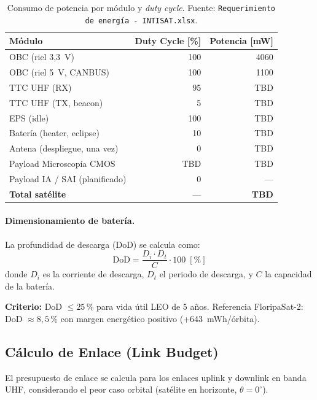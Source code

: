 \begin{table}[h]
\centering
\caption{Consumo de potencia por módulo y \textit{duty cycle}. Fuente: \texttt{Requerimiento de energía - INTISAT.xlsx}.}
\label{tab:power_consumption}
\begin{tabular}{lrr}
\toprule
\textbf{Módulo} & \textbf{Duty Cycle [\%]} & \textbf{Potencia [mW]} \\
\midrule
OBC (riel 3{,}3~V)                & 100 & 4060 \\
OBC (riel 5~V, CANBUS)            & 100 & 1100 \\
TTC UHF (RX)                      & 95  & TBD \\
TTC UHF (TX, beacon)              & 5   & TBD \\
EPS (idle)                        & 100 & TBD \\
Batería (heater, eclipse)         & 10  & TBD \\
Antena (despliegue, una vez)      & 0   & TBD \\
Payload Microscopía CMOS          & TBD & TBD \\
Payload IA / SAI (planificado)    & 0   & --- \\
\midrule
\textbf{Total satélite}           & --- & \textbf{TBD} \\
\bottomrule
\end{tabular}
\end{table}

\paragraph{Dimensionamiento de batería.}
La profundidad de descarga (DoD) se calcula como:
\begin{equation}
\mathrm{DoD} = \frac{D_i \cdot D_t}{C} \cdot 100\;[\%]
\label{eq:dod}
\end{equation}
donde $D_i$ es la corriente de descarga, $D_t$ el periodo de descarga, y $C$ la capacidad de la batería.

\textbf{Criterio:} DoD $\le 25$\,\% para vida útil LEO de 5 años. Referencia FloripaSat-2: DoD $\approx 8{,}5$\,\% con margen energético positivo (+643~mWh/órbita).

\subsection{Cálculo de Enlace (Link Budget)}
El presupuesto de enlace se calcula para los enlaces uplink y downlink en banda UHF, considerando el peor caso orbital (satélite en horizonte, $\theta=0^\circ$).

